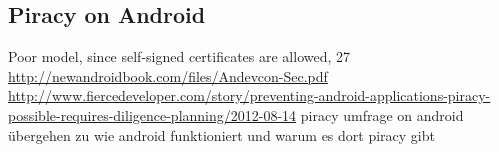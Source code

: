 \subsection{Piracy on Android }\label{subsection:foundation-piracy-android}
Poor model, since self-signed certificates are allowed, 27 \url{http://newandroidbook.com/files/Andevcon-Sec.pdf}\newline
\url{http://www.fiercedeveloper.com/story/preventing-android-applications-piracy-possible-requires-diligence-planning/2012-08-14} piracy umfrage on android\newline
übergehen zu wie android funktioniert und warum es dort piracy gibt\newline
